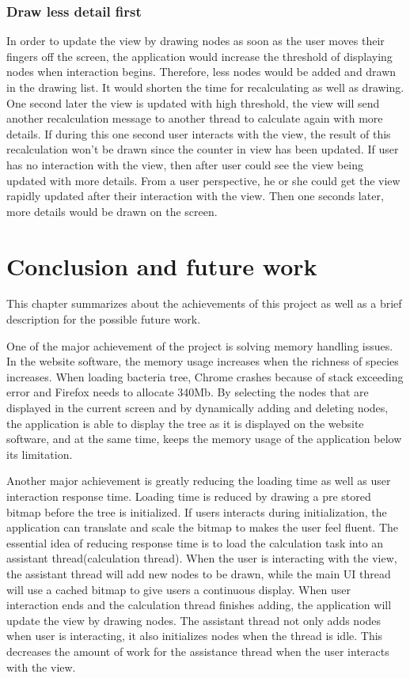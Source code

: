 \documentclass[MSc]{icldt}
\begin{document}
\subsection{Draw less detail first}

In order to update the view by drawing nodes as soon as the user moves their fingers off the screen, the application would increase the threshold of displaying nodes when interaction begins. Therefore, less nodes would be added and drawn in the drawing list. It would shorten the time for recalculating as well as drawing. One second later the view is updated with high threshold, the view will send another recalculation message to another thread to calculate again with more details. If during this one second user interacts with the view, the result of this recalculation won't be drawn since the counter in view has been updated. If user has no interaction with the view, then after user could see the view being updated with more details. From a user perspective, he or she could get the view rapidly updated after their interaction with the view. Then one seconds later, more details would be drawn on the screen.


\chapter{Conclusion and future work}

This chapter summarizes about the achievements of this project as well as a brief description for the possible future work.

One of the major achievement of the project is solving memory handling issues. In the website software, the memory usage increases when the richness of species increases. When loading bacteria tree, Chrome crashes because of stack exceeding error and Firefox needs to allocate 340Mb. By selecting the nodes that are displayed in the current screen and by dynamically adding and deleting nodes, the application is able to display the tree as it is displayed on the website software, and at the same time, keeps the memory usage of the application below its limitation.

Another major achievement is greatly reducing the loading time as well as user interaction response time. Loading time is reduced by drawing a pre stored bitmap before the tree is initialized. If users interacts during initialization, the application can translate and scale the bitmap to makes the user feel fluent. The essential idea of reducing response time is to load the calculation task into an assistant thread(calculation thread). When the user is interacting with the view, the assistant thread will add new nodes to be drawn, while the main UI thread will use a cached bitmap to give users a continuous display. When user interaction ends and the calculation thread finishes adding, the application will update the view by drawing nodes. The assistant thread not only adds nodes when user is interacting, it also initializes nodes when the thread is idle. This decreases the amount of work for the assistance thread when the user interacts with the view.
\end{document}
